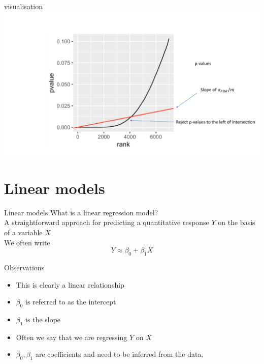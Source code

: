 \documentclass{bredelebeamer}
\begin{document}
\begin{frame}{visualisation}
\includegraphics[width=1\textwidth]{fdrvis}
\end{frame}



\section{Linear models}
\begin{frame}{Linear models}
What is a linear regression model?
\\
A straightforward approach for predicting a quantitative response $Y$ on the basis of a variable $X$
\\
We often write
\begin{equation}
Y \approx \beta_0 + \beta_1 X
\end{equation}
\begin{block}{Observations}
\begin{itemize}
\item This is clearly a linear relationship
\item $\beta_0$ is referred to as the intercept
\item $\beta_1$ is the slope
\item Often we say that we are regressing $Y$ on $X$
\item $\beta_0, \beta_1$ are coefficients and need to be inferred from the data.
\end{itemize}
\end{block}
\end{frame}
\end{document}

